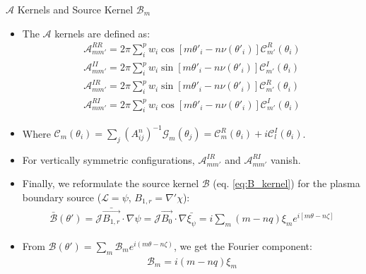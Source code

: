 \documentclass[8pt]{beamer}
\begin{document}
\begin{frame}{\color{white} $\mathcal{A}$ Kernels and Source Kernel $\mathcal{B}_m$}
\begin{itemize}
    \item The $\mathcal{A}$ kernels are defined as:
    \begin{align}
         \mathcal{A}_{mm'}^{RR} = 2\pi \sum_{i}^{p} w_i \cos[m\theta'_i - n\nu(\theta'_i)]\mathcal{C}_{m'}^{R}(\theta_i) \nonumber \\
         \mathcal{A}_{mm'}^{II} = 2\pi \sum_{i}^{p} w_i \sin[m\theta'_i - n\nu(\theta'_i)]\mathcal{C}_{m'}^{I}(\theta_i) \nonumber\\
         \mathcal{A}_{mm'}^{IR} = 2\pi \sum_{i}^{p} w_i \sin[m\theta'_i - n\nu(\theta'_i)]\mathcal{C}_{m'}^{R}(\theta_i) \nonumber\\
         \mathcal{A}_{mm'}^{RI} = 2\pi \sum_{i}^{p} w_i \cos[m\theta'_i - n\nu(\theta'_i)]\mathcal{C}_{m'}^{I}(\theta_i) \label{eq:A_kernel_def}
    \end{align}
    \item Where $\mathcal{C}_m(\theta_i) = \sum_j (A^n_{ij})^{-1} \mathcal{G}_m(\theta_j) = \mathcal{C}^R_m(\theta_i) + i\mathcal{C}^I_l(\theta_i)$.
    \item For vertically symmetric configurations, $\mathcal{A}_{mm'}^{IR}$ and $\mathcal{A}_{mm'}^{RI}$ vanish.
    \item Finally, we reformulate the source kernel $\mathcal{B}$ (eq. \ref{eq:B_kernel}) for the plasma boundary source ($\mathcal{L} =\psi$, $B_{1,r} = \nabla'\chi$):
    \begin{align}
         \bar{\mathcal{B}}(\theta') = \mathcal{J}\bar{\vec{B_{1,r}}} \cdot \nabla\psi = \mathcal{J} \vec{B_0} \cdot \nabla \bar{\xi_\psi} = i \sum_m (m-nq) \xi_m e^{i[m\theta-n\zeta]}
    \end{align}
    \item From $\mathcal{B}(\theta') = \sum_m \mathcal{B}_m e^{i(m\theta - n \zeta)}$, we get the Fourier component:
    \begin{align}
         \mathcal{B}_m = i(m-nq)\xi_m \label{eq:B_kernel2}
    \end{align}
\end{itemize}
\end{frame}
\end{document}
